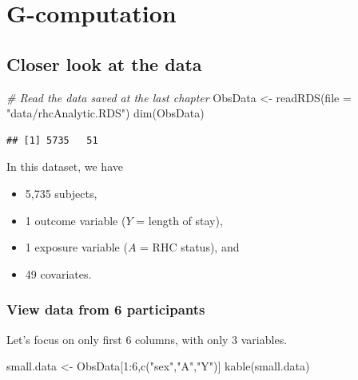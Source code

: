 \documentclass[
]{book}
\newenvironment{Shaded}{\begin{snugshade}}{\end{snugshade}}
\newcommand{\AttributeTok}[1]{\textcolor[rgb]{0.77,0.63,0.00}{#1}}
\newcommand{\CommentTok}[1]{\textcolor[rgb]{0.56,0.35,0.01}{\textit{#1}}}
\newcommand{\DecValTok}[1]{\textcolor[rgb]{0.00,0.00,0.81}{#1}}
\newcommand{\FunctionTok}[1]{\textcolor[rgb]{0.00,0.00,0.00}{#1}}
\newcommand{\NormalTok}[1]{#1}
\newcommand{\OtherTok}[1]{\textcolor[rgb]{0.56,0.35,0.01}{#1}}
\newcommand{\SpecialCharTok}[1]{\textcolor[rgb]{0.00,0.00,0.00}{#1}}
\newcommand{\StringTok}[1]{\textcolor[rgb]{0.31,0.60,0.02}{#1}}
\providecommand{\tightlist}{%
  \setlength{\itemsep}{0pt}\setlength{\parskip}{0pt}}
\begin{document}
\hypertarget{g-computation}{%
\chapter{G-computation}\label{g-computation}}

\hypertarget{closer-look-at-the-data}{%
\section{Closer look at the data}\label{closer-look-at-the-data}}

\begin{Shaded}
\begin{Highlighting}[]
\CommentTok{\# Read the data saved at the last chapter}
\NormalTok{ObsData }\OtherTok{\textless{}{-}} \FunctionTok{readRDS}\NormalTok{(}\AttributeTok{file =} \StringTok{"data/rhcAnalytic.RDS"}\NormalTok{)}
\FunctionTok{dim}\NormalTok{(ObsData)}
\end{Highlighting}
\end{Shaded}

\begin{verbatim}
## [1] 5735   51
\end{verbatim}

In this dataset, we have

\begin{itemize}
\tightlist
\item
  5,735 subjects,
\item
  1 outcome variable (\(Y\) = length of stay),
\item
  1 exposure variable (\(A\) = RHC status), and
\item
  49 covariates.
\end{itemize}

\hypertarget{view-data-from-6-participants}{%
\subsection{View data from 6 participants}\label{view-data-from-6-participants}}

Let's focus on only first 6 columns, with only 3 variables.

\begin{Shaded}
\begin{Highlighting}[]
\NormalTok{small.data }\OtherTok{\textless{}{-}}\NormalTok{ ObsData[}\DecValTok{1}\SpecialCharTok{:}\DecValTok{6}\NormalTok{,}\FunctionTok{c}\NormalTok{(}\StringTok{"sex"}\NormalTok{,}\StringTok{"A"}\NormalTok{,}\StringTok{"Y"}\NormalTok{)]}
\FunctionTok{kable}\NormalTok{(small.data)}
\end{Highlighting}
\end{Shaded}
\end{document}
